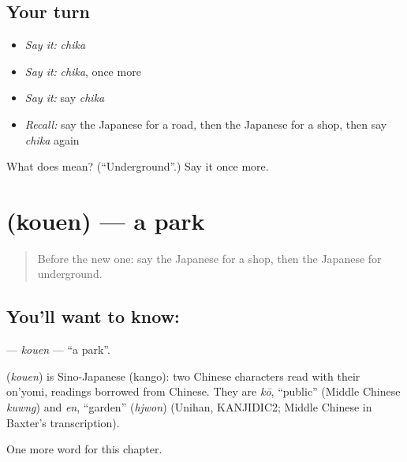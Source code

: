 \subsection*{Your turn}
\begin{itemize}
\raggedright
  \item \emph{Say it:} \emph{chika}
  \item \emph{Say it:} \emph{chika}, once more
  \item \emph{Say it:} say \emph{chika}
  \item \emph{Recall:} say the Japanese for a road, then the Japanese for a shop, then say \emph{chika} again
\end{itemize}

\begin{tcolorbox}[breakable,colback=teal!4,colframe=teal!35!black,title={Before you move on}]
What does  mean? (\textquotedblleft{}Underground\textquotedblright{}.) Say it once more.
\end{tcolorbox}
\section[\texorpdfstring{\ja{こうえん} (kouen)}{こうえん (kouen)}]{ (kouen) — a park}

\label{lesson:JA-C58-kouen}



\begin{quote}
Before the new one: say the Japanese for a shop, then the Japanese for underground.
\end{quote}

\subsection*{You'll want to know: }
\textbf{} — \emph{kouen} — \textquotedblleft{}a park\textquotedblright{}.

\begin{cousinweb}
\textbf{} (\emph{kouen}) is Sino-Japanese (kango): two Chinese characters read with their on'yomi, readings borrowed from Chinese. They are \emph{kō}, \textquotedblleft{}public\textquotedblright{} (Middle Chinese \emph{kuwng}) and \emph{en}, \textquotedblleft{}garden\textquotedblright{} (\emph{hjwon}) (Unihan, KANJIDIC2; Middle Chinese in Baxter's transcription).
\end{cousinweb}

\begin{grammarlens}[title={What you've built}]
One more word for this chapter.
\end{grammarlens}


